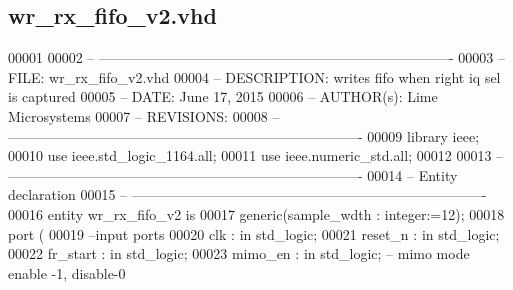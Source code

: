\subsection{wr\+\_\+rx\+\_\+fifo\+\_\+v2.\+vhd}
\label{wr__rx__fifo__v2_8vhd_source}

\begin{DoxyCode}
00001 
00002 \textcolor{keyword}{-- ---------------------------------------------------------------------------- }
00003 \textcolor{keyword}{-- FILE:    wr\_rx\_fifo\_v2.vhd}
00004 \textcolor{keyword}{-- DESCRIPTION: writes fifo when right iq sel is captured}
00005 \textcolor{keyword}{-- DATE:    June 17, 2015}
00006 \textcolor{keyword}{-- AUTHOR(s):   Lime Microsystems}
00007 \textcolor{keyword}{-- REVISIONS:}
00008 \textcolor{keyword}{-- ---------------------------------------------------------------------------- }
00009 \textcolor{vhdlkeyword}{library }\textcolor{keywordflow}{ieee};
00010 \textcolor{vhdlkeyword}{use }ieee.std\_logic\_1164.\textcolor{keywordflow}{all};
00011 \textcolor{vhdlkeyword}{use }ieee.numeric\_std.\textcolor{keywordflow}{all};
00012 
00013 \textcolor{keyword}{-- ----------------------------------------------------------------------------}
00014 \textcolor{keyword}{-- Entity declaration}
00015 \textcolor{keyword}{-- ----------------------------------------------------------------------------}
00016 \textcolor{keywordflow}{entity }wr_rx_fifo_v2 \textcolor{keywordflow}{is}
00017   \textcolor{keywordflow}{generic}\textcolor{vhdlchar}{(}\textcolor{vhdlchar}{sample_wdth} \textcolor{vhdlchar}{:} \textcolor{comment}{integer}\textcolor{vhdlchar}{:=}\textcolor{vhdllogic}{}\textcolor{vhdllogic}{12}\textcolor{vhdlchar}{)};
00018   \textcolor{keywordflow}{port} \textcolor{vhdlchar}{(}
00019 \textcolor{keyword}{        --input ports }
00020             \textcolor{vhdlchar}{clk}         \textcolor{vhdlchar}{:} \textcolor{keywordflow}{in} \textcolor{comment}{std\_logic};
00021             \textcolor{vhdlchar}{reset_n}     \textcolor{vhdlchar}{:} \textcolor{keywordflow}{in} \textcolor{comment}{std\_logic};
00022             \textcolor{vhdlchar}{fr_start}        \textcolor{vhdlchar}{:} \textcolor{keywordflow}{in} \textcolor{comment}{std\_logic};
00023             \textcolor{vhdlchar}{mimo_en}     \textcolor{vhdlchar}{:} \textcolor{keywordflow}{in} \textcolor{comment}{std\_logic};\textcolor{keyword}{ -- mimo mode enable -1, disable-0}

\end{DoxyCode}
